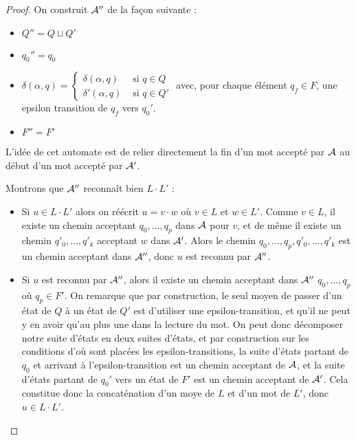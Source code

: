  \begin{proof}
     On construit $\mathcal A''$ de la façon suivante :
     \begin{itemize}[label=$\bullet$]
         \item $Q'' = Q\sqcup Q'$
         \item $q_0'' = q_0$
         \item $\delta(\alpha,q) = \left\{ \begin{array}{ll}
             \delta(\alpha,q) & \text{ si } q\in Q \\
             \delta'(\alpha,q) & \text{ si } q \in Q'
         \end{array} \right.$ avec, pour chaque élément $q_f \in F$, une epsilon transition de $q_f$ vers $q_0'$.
         \item $F''=F'$
     \end{itemize}

     L'idée de cet automate est de relier directement la fin d'un mot accepté par $\mathcal A$ au début d'un mot accepté par $\mathcal A'$.

     Montrons que $\mathcal A''$ reconnaît bien $L\cdot L'$ :
     \begin{itemize}[label=$\bullet$]
         \item Si $u\in L\cdot L'$ alors on réécrit $u = v \cdot w$ où $v\in L$ et $w\in L'$. Comme $v\in L$, il existe un chemin acceptant $q_0,\ldots,q_p$ dans $\mathcal A$ pour $v$, et de même il existe un chemin $q'_0,\ldots,q'_k$ acceptant $w$ dans $\mathcal A'$. Alors le chemin $q_0,\ldots,q_p,q'_0,\ldots,q'_k$ est un chemin acceptant dans $\mathcal A''$, donc $u$ est reconnu par $\mathcal A''$.
         \item Si $u$ est reconnu par $\mathcal A''$, alors il existe un chemin acceptant dans $\mathcal A''$ $q_0,\ldots, q_p$ où $q_p \in F'$. On remarque que par construction, le seul moyen de passer d'un état de $Q$ à un état de $Q'$ est d'utiliser une epsilon-transition, et qu'il ne peut y en avoir qu'au plus une dans la lecture du mot. On peut donc décomposer notre suite d'états en deux suites d'états, et par construction sur les conditions d'où sont placées les epsilon-transitions, la suite d'états partant de $q_0$ et arrivant à l'epsilon-transition est un chemin acceptant de $\mathcal A$, et la suite d'états partant de $q_0'$ vers un état de $F'$ est un chemin acceptant de $\mathcal A'$. Cela constitue donc la concaténation d'un moye de $L$ et d'un mot de $L'$, donc $u\in L\cdot L'$.
     \end{itemize}
 \end{proof}

